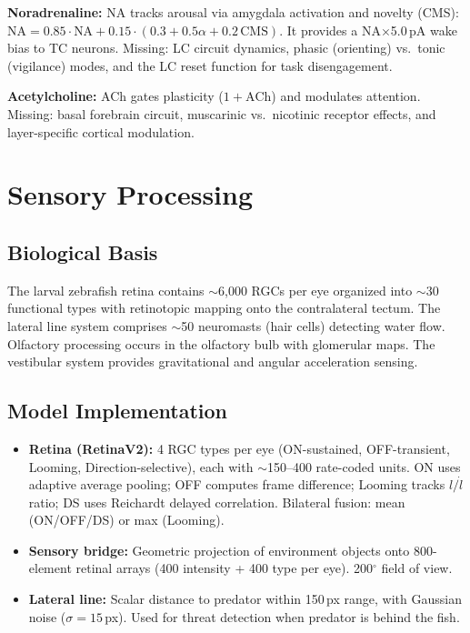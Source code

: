 \documentclass[11pt,a4paper]{article}
\begin{document}
\textbf{Noradrenaline:} NA tracks arousal via amygdala activation and novelty (CMS):
$\text{NA} = 0.85 \cdot \text{NA} + 0.15 \cdot (0.3 + 0.5\alpha + 0.2\,\text{CMS})$.
It provides a NA$\times$5.0\,pA wake bias to TC neurons.  Missing: LC circuit
dynamics, phasic (orienting) vs.\ tonic (vigilance) modes, and the LC reset
function for task disengagement.

\textbf{Acetylcholine:} ACh gates plasticity ($1 + \text{ACh}$) and modulates
attention.  Missing: basal forebrain circuit, muscarinic vs.\ nicotinic receptor
effects, and layer-specific cortical modulation.

\section{Sensory Processing}
\label{sec:sensory}

\subsection{Biological Basis}

The larval zebrafish retina contains $\sim$6,000 RGCs per eye organized into
$\sim$30 functional types with retinotopic mapping onto the contralateral tectum.
The lateral line system comprises $\sim$50 neuromasts (hair cells) detecting water
flow.  Olfactory processing occurs in the olfactory bulb with glomerular maps.
The vestibular system provides gravitational and angular acceleration sensing.

\subsection{Model Implementation}

\begin{itemize}[leftmargin=*]
\item \textbf{Retina (RetinaV2):} 4 RGC types per eye (ON-sustained, OFF-transient,
  Looming, Direction-selective), each with $\sim$150--400 rate-coded units.
  ON uses adaptive average pooling; OFF computes frame difference;
  Looming tracks $l/\dot{l}$ ratio; DS uses Reichardt delayed correlation.
  Bilateral fusion: mean (ON/OFF/DS) or max (Looming).
\item \textbf{Sensory bridge:} Geometric projection of environment objects onto
  800-element retinal arrays (400 intensity + 400 type per eye).
  200$^\circ$ field of view.
\item \textbf{Lateral line:} Scalar distance to predator within 150\,px range,
  with Gaussian noise ($\sigma=15$\,px).  Used for threat detection when
  predator is behind the fish.
\end{itemize}
\end{document}
